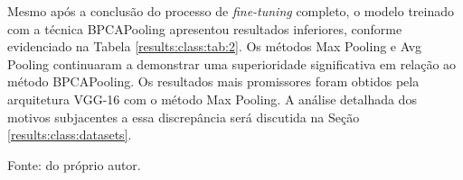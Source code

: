 Mesmo após a conclusão do processo de \textit{fine-tuning} completo, o modelo treinado com a técnica BPCAPooling apresentou resultados inferiores, conforme evidenciado na Tabela \ref{results:class:tab:2}. Os métodos Max Pooling e Avg Pooling continuaram a demonstrar uma superioridade significativa em relação ao método BPCAPooling. Os resultados mais promissores foram obtidos pela arquitetura VGG-16 com o método Max Pooling. A análise detalhada dos motivos subjacentes a essa discrepância será discutida na Seção \ref{results:class:datasets}.

\begin{table}[H]
    \centering
    \caption[\textit{Fine-tuning} de VGG-16 (CIFAR 100)]{Resultados por fase de \textit{fine-tuning} de VGG-16 aplicada no conjunto de dados CIFAR 100.}
    \label{results:class:tab:2}

    \vspace*{1 cm}
    Fonte: do próprio autor.
\end{table}

